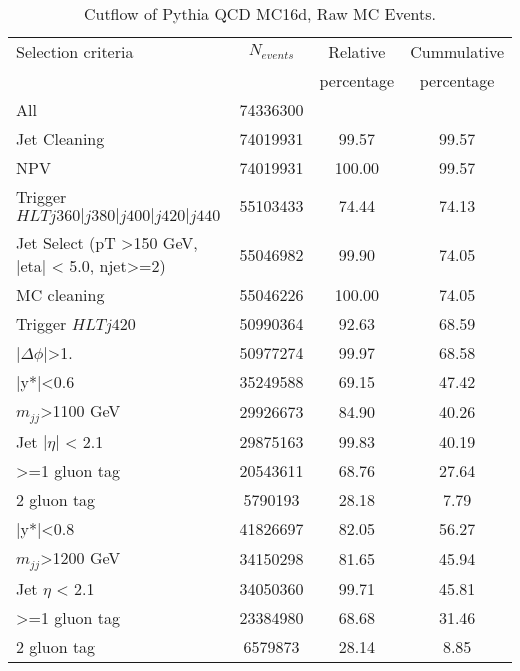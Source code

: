 \begin{table}[ht]
\begin{center}
\begin{tabular}{|l|c|c|c|}
\hline
Selection criteria & $N_{events}$ & Relative & Cummulative \\
   &             & percentage & percentage \\
\hline
All & 74336300 &  & \\
Jet Cleaning & 74019931 & 99.57 & 99.57 \\
NPV & 74019931 & 100.00 & 99.57 \\
Trigger $HLT j360|j380|j400|j420|j440$ & 55103433 & 74.44 & 74.13 \\
Jet Select (pT >150 GeV, |eta| < 5.0, njet>=2) & 55046982 & 99.90 & 74.05 \\
MC cleaning & 55046226 & 100.00 & 74.05 \\
\hline
Trigger $HLT j420$ & 50990364 & 92.63 & 68.59 \\
$|\Delta\phi|$>1. & 50977274 & 99.97 & 68.58 \\
\hline\hline
|y*|<0.6 & 35249588 & 69.15 & 47.42 \\
$m_{jj}$>1100 GeV & 29926673 & 84.90 & 40.26 \\
Jet $|\eta|$ < 2.1 & 29875163 & 99.83 & 40.19 \\
>=1 gluon tag & 20543611 & 68.76 & 27.64 \\
2 gluon tag & 5790193 & 28.18 & 7.79 \\
\hline\hline
|y*|<0.8 & 41826697 & 82.05 & 56.27 \\
$m_{jj}$>1200 GeV & 34150298 & 81.65 & 45.94 \\
Jet $\eta$ < 2.1 & 34050360 & 99.71 & 45.81 \\
>=1 gluon tag & 23384980 & 68.68 & 31.46 \\
2 gluon tag & 6579873 & 28.14 & 8.85 \\
\hline
\end{tabular}
\end{center}
\caption{Cutflow of Pythia QCD MC16d, Raw MC Events.}
\label{tab:bckgdcutflowMC16dRaw}
\end{table}%


